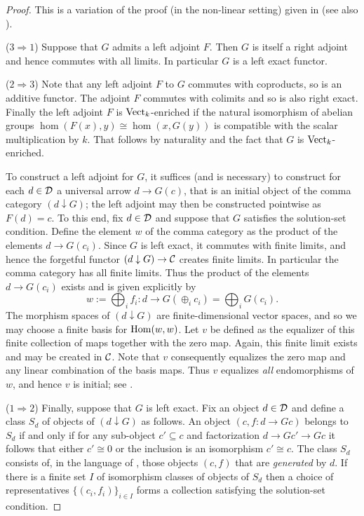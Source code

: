 \documentclass{amsart}
\begin{document}
\begin{proof} This is a variation of the proof (in the non-linear setting) given in \cite[V.6.Thm 2]{MR0354798} (see also \cite[Ex. 3-M]{MR0166240}).

($3 \Rightarrow 1$) Suppose that $G$ admits a left adjoint $F$. Then $G$ is itself a right adjoint and hence commutes with all limits. In particular $G$ is a left exact functor. 

($2 \Rightarrow 3$) Note that any left adjoint $F$ to $G$ commutes with coproducts, so is an additive functor.  The adjoint $F$ commutes with colimits and so is also right exact.  Finally the left adjoint $F$ is ${\mathrm{Vect}_k}$-enriched if the natural isomorphism of abelian groups $\hom( F(x), y) \cong \hom(x, G(y))$ is compatible with the scalar multiplication by $k$. That follows by naturality and the fact that $G$ is ${\mathrm{Vect}_k}$-enriched.


To construct a left adjoint for $G$, it suffices (and is necessary) to construct for each $d \in \mathcal D$ a universal arrow $d \to G(c)$, that is an initial object of the comma category $(d \downarrow G)$; the left adjoint may then be constructed pointwise as $F(d) = c$. To this end, fix $d \in \mathcal D$ and suppose that $G$ satisfies the solution-set condition. Define the element $w$ of the comma category as the product of the elements $d \to G(c_i)$. Since $G$ is left exact, it commutes with finite limits, and hence the forgetful functor $(d \downarrow G) \to \mathcal C$ creates finite limits. In particular the comma category has all finite limits.  Thus the product of the elements $d \rightarrow G(c_i)$ exists and is given explicitly by
\begin{equation*}
	w := \bigoplus_i f_i :  d \to G( \oplus_i c_i) = \bigoplus_i G(c_i).
\end{equation*}
The morphism spaces of $(d \downarrow G)$ are finite-dimensional vector spaces, and so we may choose a finite basis for $\operatorname{Hom}(w,w)$. Let $v$ be defined as the equalizer of this finite collection of maps together with the zero map. Again, this finite limit exists and may be created in $\mathcal C$. Note that $v$ consequently equalizes the zero map and any linear combination of the basis maps. Thus $v$ equalizes {\em all} endomorphisms of $w$, and hence $v$ is initial; see  \cite[V.6.Thm 1]{MR0354798}. 

($1 \Rightarrow 2$) Finally, suppose that $G$ is left exact. Fix an object $d \in \mathcal D$ and define a class $S_d$ of objects of $(d \downarrow G)$ as follows. An object $(c, f:d \to G c)$ belongs to $S_d$ if and only if for any sub-object $c' \subseteq c$ and factorization $d \to G c' \to G c$ it follows that either $c' \cong 0$ or the inclusion is an isomorphism $c' \cong c$.  The class $S_d$ consists of, in the language of \cite[Ex. 3-J]{MR0166240}, those objects $(c,f)$ that are {\em generated} by $d$. If there is a finite set $I$ of isomorphism classes of objects of $S_d$ then a choice of representatives $\{(c_i, f_i)\}_{i \in I}$ forms a collection satisfying the solution-set condition.


\end{proof}
\end{document}
